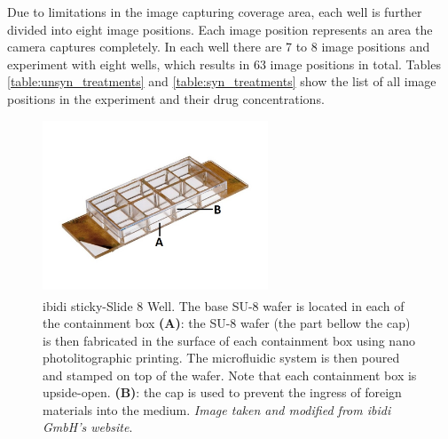 \documentclass[pdftex,12pt,a4paper]{report}
\begin{document}
Due to limitations in the image capturing coverage area, each well is further divided into eight image positions. Each image position represents an area the camera captures completely. In each well there are 7 to 8 image positions and experiment with eight wells, which results in 63 image positions in total. Tables  \ref{table:unsyn_treatments} and \ref{table:syn_treatments} show the list of all image positions in the experiment and their drug concentrations.

\begin{figure}[H]
\centering
\includegraphics[width=0.6\textwidth]{images/sticky-slide-8-well-marked}
\caption[ibidi\textsuperscript{\textregistered} sticky-Slide 8 Well]{ibidi\textsuperscript{\textregistered} sticky-Slide 8 Well. The base SU-8 wafer is located in each of the containment box \textbf{(A)}: the SU-8 wafer  (the part bellow the cap) is then fabricated in the surface of each containment box using nano photolitographic printing. The microfluidic system is then poured and stamped on top of the wafer. Note that each containment box is upside-open. \textbf{(B)}: the cap is used to prevent the ingress of foreign materials into the medium. \textit{Image taken and modified from ibidi GmbH's website}.}
\label{fig:ibidi}
\end{figure}
\end{document}

